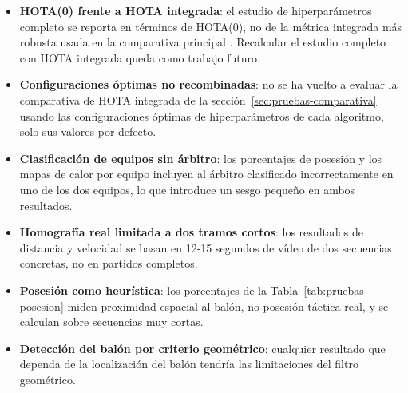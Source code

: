 \begin{itemize}
  \item \textbf{HOTA(0) frente a HOTA integrada}: el estudio de
        hiperparámetros completo
        se reporta en términos de HOTA(0), no de la métrica integrada más
        robusta usada en la comparativa principal
        . Recalcular el estudio
        completo con HOTA integrada queda
        como trabajo futuro.
  \item \textbf{Configuraciones óptimas no recombinadas}: no se ha vuelto a
        evaluar la comparativa de HOTA integrada de la
        sección~\ref{sec:pruebas-comparativa} usando las configuraciones
        óptimas de hiperparámetros de cada algoritmo, solo sus valores por
        defecto.
  \item \textbf{Clasificación de equipos sin árbitro}: los porcentajes de
        posesión y los mapas de calor por equipo incluyen al árbitro
        clasificado incorrectamente en uno de los dos equipos, lo que introduce un sesgo
        pequeño en ambos resultados.
  \item \textbf{Homografía real limitada a dos tramos cortos}: los
        resultados de distancia y velocidad se basan en 12-15 segundos de
        vídeo de dos secuencias concretas, no en partidos completos.
  \item \textbf{Posesión como heurística}: los
        porcentajes de la Tabla~\ref{tab:pruebas-posesion} miden proximidad
        espacial al balón, no posesión táctica real, y se calculan sobre
        secuencias muy cortas.
  \item \textbf{Detección del balón por criterio geométrico}: cualquier
        resultado que dependa de la localización del balón tendría
        las limitaciones del filtro geométrico.
\end{itemize}

